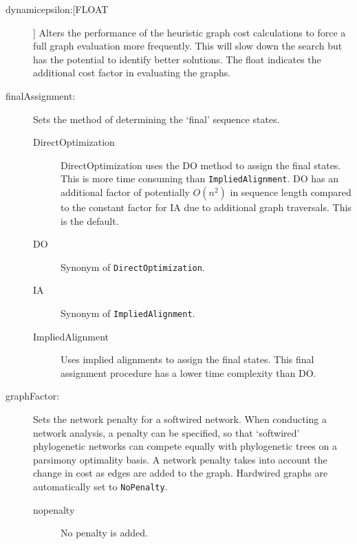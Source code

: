 \begin{description}
\begin{description}
		\end{description}
			

		\item[dynamicepsilon:[FLOAT]] Alters the performance of the heuristic graph cost 
		calculations to force a full graph evaluation more frequently. This will slow down the
		search but has the potential to identify better solutions. The float indicates the additional 
		cost factor in evaluating the graphs.
			
		\item[finalAssignment:] Sets the method of determining the `final' sequence states. 
						
		\begin{description}
			
			\item[DirectOptimization] DirectOptimization uses the DO method to assign 
			the final states. This is more time consuming than \texttt{ImpliedAlignment}. 
			DO has an additional factor of potentially $O(n^2)$ in sequence length compared 
			to the constant factor for IA due to additional graph traversals. This is the default.

			\item[DO] Synonym of \texttt{DirectOptimization}.
			
			\item[IA] Synonym of \texttt{ImpliedAlignment}.
			
			\item[ImpliedAlignment] Uses implied alignments to assign the final states. This 
			final assignment procedure has a lower time complexity than DO.
			
		\end{description}
			
		\item[graphFactor:] Sets the network penalty for a softwired network. When conducting 
		a network analysis, a penalty can be specified, so that ‘softwired’ phylogenetic networks 
		can compete equally with phylogenetic trees on a parsimony optimality basis. A network 
		penalty takes into account the change in cost as edges are added to the graph. Hardwired 
		graphs are automatically set to \texttt{NoPenalty}.
			
		\begin{description}
			
			\item[nopenalty] No penalty is added.	


\end{description}
\end{description}
